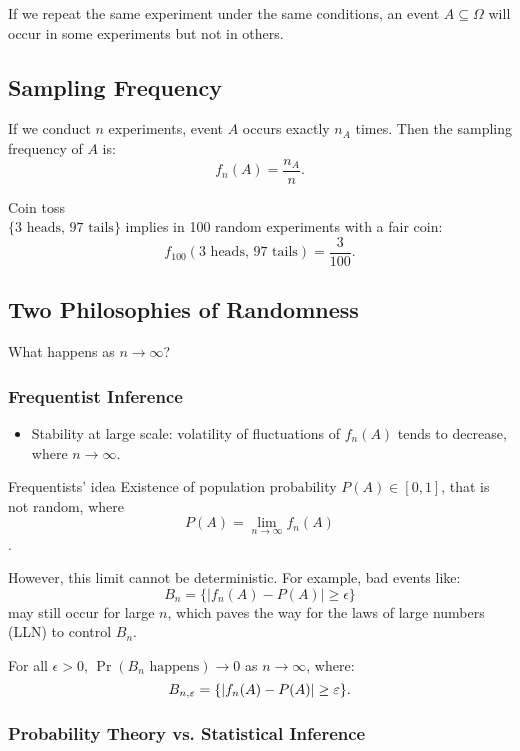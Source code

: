 \noindent If we repeat the same experiment under the same conditions, an event \(A \subseteq \Omega\) will occur in some experiments but not in others.

\subsection{Sampling Frequency}
If we conduct \(n\) experiments, event \(A\) occurs exactly \(n_A\) times. Then the sampling frequency of \(A\) is:
\[
f_n(A) = \frac{n_A}{n}.
\]

\begin{eg}{Coin toss}\\
\(\{\text{3 heads, 97 tails}\}\) implies in 100 random experiments with a fair coin: 
\[
    f_{100}(\text{3 heads, 97 tails}) = \frac{3}{100}.
\]
\end{eg}


\subsection{Two Philosophies of Randomness}
\noindent What happens as \(n \to \infty\)?
\subsubsection{Frequentist Inference}
\begin{itemize}
    \item Stability at large scale: volatility of fluctuations of \(f_n(A)\) tends to decrease, where \(n \to \infty\).
\end{itemize}

\begin{thm}{Frequentists' idea}
	Existence of population probability \(P(A) \in [0, 1]\), that is not random, where 
	\[P(A) = \lim_{n \to \infty} f_n(A)\].
\end{thm}
\noindent However, this limit cannot be deterministic. For example, bad events like:
\[
B_n = \{|f_n(A) - P(A)| \geq \epsilon\}
\]
may still occur for large \(n\), which paves the way for the laws of large numbers (LLN) to control \(B_n\).


\begin{rmk}
For all \(\epsilon > 0\), \(\Pr(B_n \text{ happens}) \to 0\) as \(n \to \infty\), where:
\[
B_{n, {\varepsilon}} = \{|f_n(A) - P(A)| \geq \varepsilon\}.
\]
\end{rmk}

\subsubsection{Probability Theory vs. Statistical Inference}

